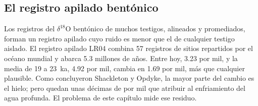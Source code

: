 \subsection*{El registro apilado bentónico}

Los registros del $\delta^{18}$O bentónico de muchos testigos, alineados y promediados, forman un registro apilado cuyo ruido
es menor que el de cualquier testigo aislado. El registro apilado LR04 combina 57 registros de sitios repartidos por
el océano mundial y abarca 5.3 millones de años. Entre hoy, \num{3.23} por mil, y la media de
\num{19} a \qty{23}{ka}, \num{4.92} por mil, cambia en \num{1.69} por mil, más que cualquier
 plausible. Como concluyeron Shackleton y Opdyke, la mayor parte del cambio es el hielo;
pero quedan unas décimas de por mil que atribuir al enfriamiento del agua profunda. El problema de este capítulo mide ese residuo.

